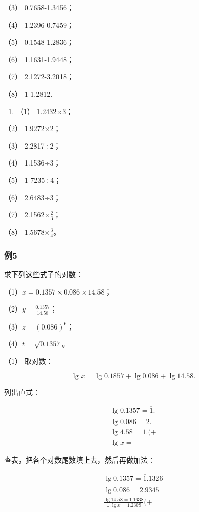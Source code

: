 （3） 0.7658-1.3456；

（4） 1.2396-0.7459；

（5） 0.1548-1.2836；

（6） 1.1631-1.9448；

（7） 2.1272-3.2018；

（8） 1-1.2812.

\begin{enumerate}[start=2]
\item
  （1） 1.2432×3；
\end{enumerate}

（2） 1.9272×2；

（3） 2.2817÷2；

（4） 1.1536÷3；

（5） 1 7235÷4；

（6） 2.6483÷3；

（7） 2.1562×\(\frac{2}{3}\)；

（8） 1.5678×\(\frac{3}{4}\)。

\subsubsection{例5}

求下列这些式子的对数：

（1）\(x = 0.1357 \times 0.086 \times 14.58\)；

（2）\(y = \frac{0.1357}{14.58}\)；

（3）\(z = (0.086)^{6}\)；

（4）\(t = \sqrt{0.1357}\)。

 （1） 取对数：

\[
\lg x = \lg 0.1857 + \lg 0.086 + \lg 14.58.
\]

列出直式：

\[
\boxed { \begin{array}{c} \lg 0.1357 = \overline {{1}}. \\ \lg 0.086 = \overline {{2}}. \\ \lg 4.58 = 1. (+ \\ \lg x = \end{array} }
\]

查表，把各个对数尾数填上去，然后再做加法：

\[
\begin{array}{l} \lg 0.1357 = \overline {{1}}. 1326 \\ \lg 0.086 = \overline {{2}}. 9345 \\ \frac{\lg 14.58 = 1.1638}{... \lg x = 1.2309} (+ \\ \end{array}
\]

